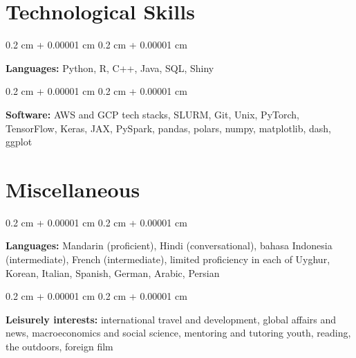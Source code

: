 \documentclass[10pt, letterpaper]{article}
\newenvironment{onecolentry}{
    \begin{adjustwidth}{
        0.2 cm + 0.00001 cm
    }{
        0.2 cm + 0.00001 cm
    }
}{
    \end{adjustwidth}
} %
\let\hrefWithoutArrow\href
\renewcommand{\href}[2]{\hrefWithoutArrow{#1}{\mbox{\ifthenelse{\equal{#2}{}}{ }{#2 }\raisebox{.15ex}{\footnotesize \faExternalLink*}}}}
\begin{document}


    \section{Technological Skills}
        
        \begin{onecolentry}
            \textbf{Languages:} Python, R, C++, Java, SQL, Shiny
        \end{onecolentry}

        \vspace{0.2 cm}

        \begin{onecolentry}
            \textbf{Software:} AWS and GCP tech stacks, SLURM, Git, Unix, PyTorch, TensorFlow, Keras, JAX, PySpark, pandas, polars, numpy, matplotlib, dash, ggplot
        \end{onecolentry} 

        \section{Miscellaneous}
        
        \begin{onecolentry}
            \textbf{Languages:} Mandarin (proficient), Hindi (conversational), bahasa Indonesia (intermediate), French (intermediate), limited proficiency in each of Uyghur, Korean, Italian, Spanish, German, Arabic, Persian
        \end{onecolentry}

        \vspace{0.2 cm}

        \begin{onecolentry}
            \textbf{Leisurely interests:} international travel and development, global affairs and news, macroeconomics and social science, mentoring and tutoring youth, reading, the outdoors, foreign film
        \end{onecolentry} 
\end{document}
